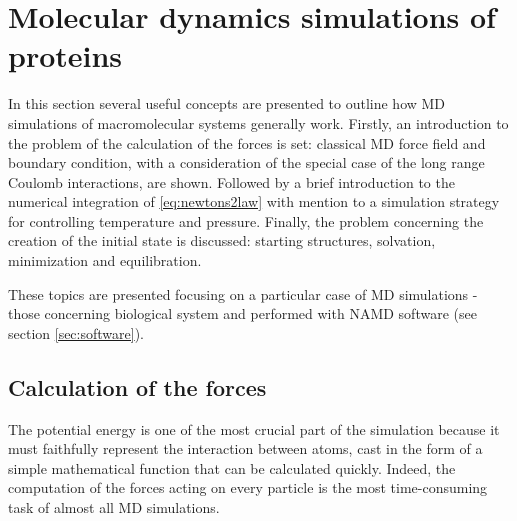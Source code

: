 \section{Molecular dynamics simulations of proteins}

In this section several useful concepts are presented to outline how MD simulations of macromolecular systems generally work. Firstly, an introduction to the problem of the calculation of the forces is set: classical MD force field and boundary condition, with a consideration of the special case of the long range Coulomb interactions, are shown. Followed by a brief introduction to the numerical integration of \eqref{eq:newtons2law} with mention to a simulation strategy for controlling temperature and pressure. Finally, the problem concerning the creation of the initial state is discussed: starting structures, solvation, minimization and equilibration.

These topics are presented focusing on a particular case of MD simulations - those concerning biological system and performed with NAMD software (see section \ref{sec:software}). 


\subsection{Calculation of the forces}
The potential energy is one of the most crucial part of the simulation because it must faithfully represent the interaction between atoms, cast in the form of a simple mathematical function that can be calculated quickly. Indeed, the computation of the forces acting on every particle is the most time-consuming task of almost all MD simulations.

